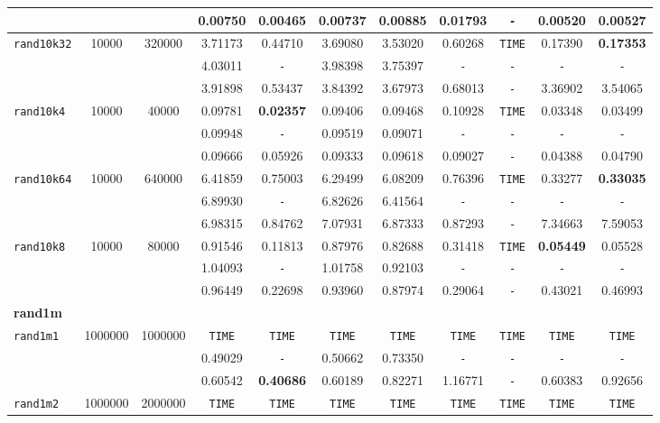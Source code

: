 {\begin{tabular}{ l c c | c c c c c c c c }
 &  &  & 0.00750 & 0.00465 & 0.00737 & 0.00885 & 0.01793 & \verb|-| & 0.00520 & 0.00527 \\
\hline
\verb|rand10k32| & 10000 & 320000 & 3.71173 & 0.44710 & 3.69080 & 3.53020 & 0.60268 & \verb|TIME| & 0.17390 & \textbf{0.17353} \\
 &  &  & 4.03011 & \verb|-| & 3.98398 & 3.75397 & \verb|-| & \verb|-| & \verb|-| & \verb|-| \\
 &  &  & 3.91898 & 0.53437 & 3.84392 & 3.67973 & 0.68013 & \verb|-| & 3.36902 & 3.54065 \\
\hline
\verb|rand10k4| & 10000 & 40000 & 0.09781 & \textbf{0.02357} & 0.09406 & 0.09468 & 0.10928 & \verb|TIME| & 0.03348 & 0.03499 \\
 &  &  & 0.09948 & \verb|-| & 0.09519 & 0.09071 & \verb|-| & \verb|-| & \verb|-| & \verb|-| \\
 &  &  & 0.09666 & 0.05926 & 0.09333 & 0.09618 & 0.09027 & \verb|-| & 0.04388 & 0.04790 \\
\hline
\verb|rand10k64| & 10000 & 640000 & 6.41859 & 0.75003 & 6.29499 & 6.08209 & 0.76396 & \verb|TIME| & 0.33277 & \textbf{0.33035} \\
 &  &  & 6.89930 & \verb|-| & 6.82626 & 6.41564 & \verb|-| & \verb|-| & \verb|-| & \verb|-| \\
 &  &  & 6.98315 & 0.84762 & 7.07931 & 6.87333 & 0.87293 & \verb|-| & 7.34663 & 7.59053 \\
\hline
\verb|rand10k8| & 10000 & 80000 & 0.91546 & 0.11813 & 0.87976 & 0.82688 & 0.31418 & \verb|TIME| & \textbf{0.05449} & 0.05528 \\
 &  &  & 1.04093 & \verb|-| & 1.01758 & 0.92103 & \verb|-| & \verb|-| & \verb|-| & \verb|-| \\
 &  &  & 0.96449 & 0.22698 & 0.93960 & 0.87974 & 0.29064 & \verb|-| & 0.43021 & 0.46993 \\
\hline
\multicolumn{11}{l}{\textbf{rand1m}} \\
\hline
\verb|rand1m1| & 1000000 & 1000000 & \verb|TIME| & \verb|TIME| & \verb|TIME| & \verb|TIME| & \verb|TIME| & \verb|TIME| & \verb|TIME| & \verb|TIME| \\
 &  &  & 0.49029 & \verb|-| & 0.50662 & 0.73350 & \verb|-| & \verb|-| & \verb|-| & \verb|-| \\
 &  &  & 0.60542 & \textbf{0.40686} & 0.60189 & 0.82271 & 1.16771 & \verb|-| & 0.60383 & 0.92656 \\
\hline
\verb|rand1m2| & 1000000 & 2000000 & \verb|TIME| & \verb|TIME| & \verb|TIME| & \verb|TIME| & \verb|TIME| & \verb|TIME| & \verb|TIME| & \verb|TIME| \\

\end{tabular}}
